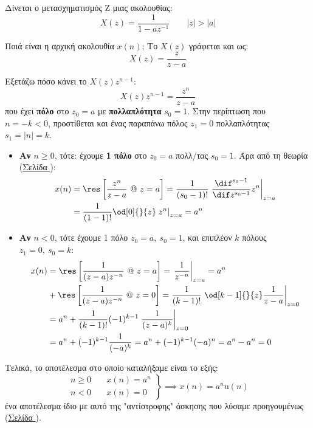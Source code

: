 \documentclass[11pt,a4paper,notitlepage,fleqn]{article}
\begin{document}
\begin{exercise}
	Δίνεται ο μετασχηματισμός Z μιας ακολουθίας:\[
	X(z) = \frac{1}{1-az^{-1}} \qquad |z|>|a|
	\]
	
	Ποιά είναι η αρχική ακολουθία \( x(n) \);
	\tcblower
	Το \( X(z) \) γράφεται και ως:
	\[
	X(z) = \frac{z}{z-a}
	\]
	
	Εξετάζω πόσο κάνει το \( X(z)z^{n-1} \):
	\[
	X(z)z^{n-1} = \frac{z^n}{z-a}
	\]
	που έχει \textbf{πόλο} στο \( z_0 = a \) με \textbf{πολλαπλότητα} \( s_0 = 1 \). Στην περίπτωση που \( n = -k <0 \), προστίθεται και ένας παραπάνω πόλος \( z_1=0 \) πολλαπλότητας
	\( s_1 = |n|= k \).
	
	\begin{itemize}
		\item \textbf{Αν \( n\geq 0 \)}, τότε:
		έχουμε \textbf{1 πόλο} στο \( z_0=a \) πολλ/τας \( s_0=1 \). Άρα από τη θεωρία (\hyperref[sec:rescalc]{Σελίδα \pageref*{sec:rescalc}}):
		\begin{align*}
			x(n) &= \res\left[
			\frac{z^n}{z-a} \ @ \ z=a
			\right] = \frac{1}{(s_0-1)!} \left. \frac{\dif^{s_0-1}}{\dif  z^{s_0-1}} z^n \right|_{z=a}
			\\ &= \frac{1}{(1-1)!}\od[0]{}{z}\left. z^n \right|_{z=a}
			= a^n
		\end{align*}
		\item \textbf{Αν \( n < 0 \)}, τότε έχουμε 1 πόλο \( z_0=a,\ s_0=1 \), και επιπλέον \( k \) πόλους \( z_1=0,\ s_0=k \):
		\begin{align*}
			x(n) &= \res\left[
			\frac{1}{(z-a)z^{-n}}\ @ \ z=a
			\right] = \left.\frac{1}{z^{-n}}\right|_{z=a} = a^n
			\\ &+ \res\left[
			\frac{1}{(z-a)z^{-n}}\ @ \ z=0
			\right] = \frac{1}{(k-1)!}\left.\od[k-1]{}{z} \frac{1}{z-a}\right|_{z=0}
			\\ &= a^n + \frac{1}{(k-1)!}(-1)^{k-1}\left.\frac{1}{(z-a)^k}\right|_{z=0}
			\\ &= a^n + (-1)^{k-1} \frac{1}{(-a)^k}
			= a^n + (-1)^{k-1}(-a)^n = a^n - a^n = 0
		\end{align*}
	\end{itemize}

    Τελικά, το αποτέλεσμα στο οποίο καταλήξαμε είναι το εξής:
    \[
    \left.\begin{aligned}
    n \geq 0 &\quad x(n)=a^n\\
    n < 0 &\quad x(n) = 0
    \end{aligned} \right\rbrace \implies x(n) = a^n\mathrm{u}(n)
    \]
    ένα αποτέλεσμα ίδιο με αυτό της "αντίστροφης" άσκησης που λύσαμε προηγουμένως (\hyperref[sec:findz1]{Σελίδα \pageref*{sec:findz1}}).
\end{exercise}
\end{document}
